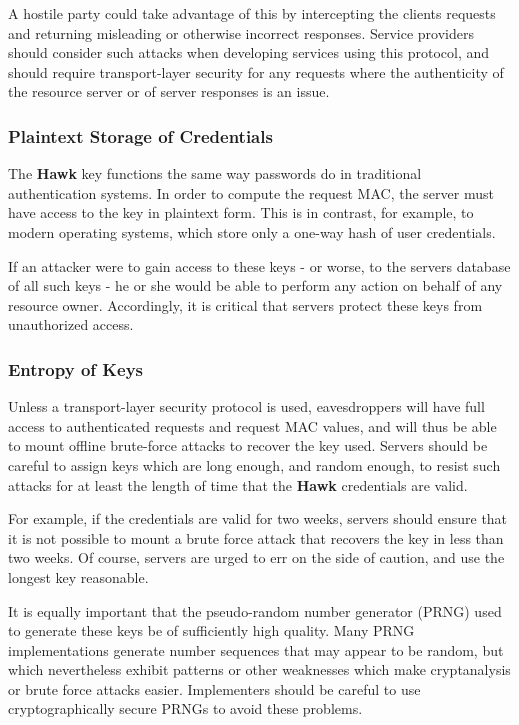 A hostile party could take advantage of this by intercepting the client\textquotesingle{}s requests and returning misleading or otherwise incorrect responses. Service providers should consider such attacks when developing services using this protocol, and should require transport-\/layer security for any requests where the authenticity of the resource server or of server responses is an issue.

\subsubsection*{Plaintext Storage of Credentials}

The {\bfseries Hawk} key functions the same way passwords do in traditional authentication systems. In order to compute the request M\+A\+C, the server must have access to the key in plaintext form. This is in contrast, for example, to modern operating systems, which store only a one-\/way hash of user credentials.

If an attacker were to gain access to these keys -\/ or worse, to the server\textquotesingle{}s database of all such keys -\/ he or she would be able to perform any action on behalf of any resource owner. Accordingly, it is critical that servers protect these keys from unauthorized access.

\subsubsection*{Entropy of Keys}

Unless a transport-\/layer security protocol is used, eavesdroppers will have full access to authenticated requests and request M\+A\+C values, and will thus be able to mount offline brute-\/force attacks to recover the key used. Servers should be careful to assign keys which are long enough, and random enough, to resist such attacks for at least the length of time that the {\bfseries Hawk} credentials are valid.

For example, if the credentials are valid for two weeks, servers should ensure that it is not possible to mount a brute force attack that recovers the key in less than two weeks. Of course, servers are urged to err on the side of caution, and use the longest key reasonable.

It is equally important that the pseudo-\/random number generator (P\+R\+N\+G) used to generate these keys be of sufficiently high quality. Many P\+R\+N\+G implementations generate number sequences that may appear to be random, but which nevertheless exhibit patterns or other weaknesses which make cryptanalysis or brute force attacks easier. Implementers should be careful to use cryptographically secure P\+R\+N\+Gs to avoid these problems.

